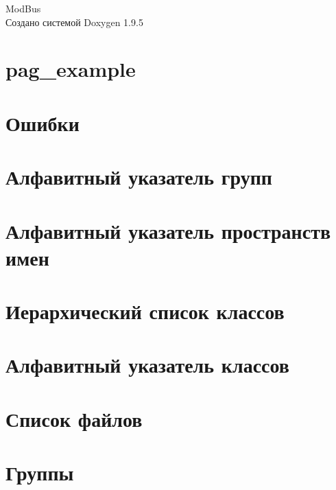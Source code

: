 \documentclass[twoside]{book}
\newcommand{\+}{\discretionary{\mbox{\scriptsize$\hookleftarrow$}}{}{}}
\newcommand{\clearemptydoublepage}{%
    \newpage{\pagestyle{empty}\cleardoublepage}%
  }
\begin{document}
  \raggedbottom
    \hypersetup{pageanchor=false,
                bookmarksnumbered=true,
                pdfencoding=unicode
               }
  \begin{titlepage}
  \vspace*{7cm}
  \begin{center}%
  {\Large Mod\+Bus}\\
  \vspace*{1cm}
  {\large Создано системой Doxygen 1.9.5}\\
  \end{center}
  \end{titlepage}
  \clearemptydoublepage
  \tableofcontents
  \clearemptydoublepage
  \hypersetup{pageanchor=true}
\chapter{pag\+\_\+example}
\label{pag_example}

\chapter{Ошибки}
\label{bug}

\chapter{Алфавитный указатель групп}

\chapter{Алфавитный указатель пространств имен}

\chapter{Иерархический список классов}

\chapter{Алфавитный указатель классов}

\chapter{Список файлов}

\chapter{Группы}









\end{document}
